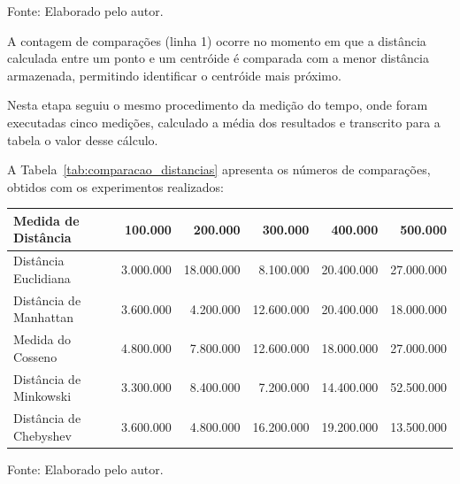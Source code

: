 \documentclass[10pt,a4paper,twocolumn]{article}
\begin{document}
\begin{center}
{\small Fonte: Elaborado pelo autor.}
\end{center} 

A contagem de comparações (linha 1) ocorre no momento em que a distância calculada entre um ponto e um centróide é comparada com a menor distância armazenada, permitindo identificar o centróide mais próximo.

Nesta etapa seguiu o mesmo procedimento da medição do tempo, onde foram executadas cinco medições, calculado a média dos resultados e transcrito para a tabela o valor desse cálculo.  

A Tabela~\ref{tab:comparacao_distancias} apresenta os números de comparações, obtidos com os experimentos realizados:



\begin{strip}
\centering

\label{tab:comparacao_distancias}


\vspace{0.2cm}

\renewcommand{\arraystretch}{1.2}

\begin{tabular}{|l|r|r|r|r|r|}
\hline

\textbf{Medida de Distância}
& \textbf{100.000}
& \textbf{200.000}
& \textbf{300.000}
& \textbf{400.000}
& \textbf{500.000} \\
\hline

Distância Euclidiana
& 3.000.000
& 18.000.000
& 8.100.000
& 20.400.000
& 27.000.000 \\
\hline

Distância de Manhattan
& 3.600.000
& 4.200.000
& 12.600.000
& 20.400.000
& 18.000.000 \\
\hline

Medida do Cosseno
& 4.800.000
& 7.800.000
& 12.600.000
& 18.000.000
& 27.000.000 \\
\hline

Distância de Minkowski
& 3.300.000
& 8.400.000
& 7.200.000
& 14.400.000
& 52.500.000 \\
\hline

Distância de Chebyshev
& 3.600.000
& 4.800.000
& 16.200.000
& 19.200.000
& 13.500.000 \\
\hline

\end{tabular}

\vspace{0.2cm}

{\small Fonte: Elaborado pelo autor.}

\end{strip}
\end{document}
